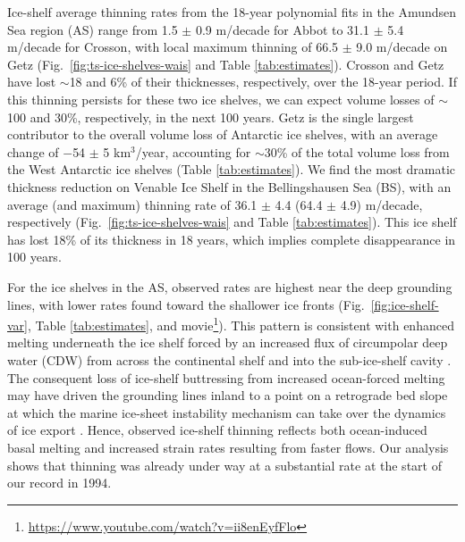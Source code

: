 Ice-shelf average thinning rates from the 18-year polynomial fits in the
Amundsen Sea region (AS) range from 1.5 $\pm$ 0.9 m/decade for Abbot to 
31.1 $\pm$ 5.4 m/decade for Crosson, with local maximum thinning of 
66.5 $\pm$ 9.0 m/decade on Getz (Fig.~\ref{fig:ts-ice-shelves-wais} and Table
\ref{tab:estimates}). Crosson and Getz have lost $\sim$18 and 6\% of their
thicknesses, respectively, over the 18-year period. If this thinning persists
for these two ice shelves, we can expect volume losses of $\sim$100 and 30\%,
respectively, in the next 100 years. Getz is the single largest contributor to
the overall volume loss of Antarctic ice shelves, with an average change of 
$-$54 $\pm$ 5 km$^3$/year, accounting for $\sim$30\% of the total volume loss
from the West Antarctic ice shelves (Table \ref{tab:estimates}). We find the most
dramatic thickness reduction on Venable Ice Shelf in the Bellingshausen Sea
(BS), with an average (and maximum) thinning rate of 36.1 $\pm$ 4.4
(64.4 $\pm$ 4.9) m/decade, respectively (Fig.~\ref{fig:ts-ice-shelves-wais} and Table
\ref{tab:estimates}). This ice shelf has lost 18\% of its thickness in 18 years,
which implies complete disappearance in 100 years.

For the ice shelves in the AS, observed rates
are highest near the deep grounding lines, with
lower rates found toward the shallower ice fronts
(Fig.~\ref{fig:ice-shelf-var}, Table \ref{tab:estimates}, and movie\footnote{\url{https://www.youtube.com/watch?v=ii8enEyfFlo}}). This pattern is
consistent with enhanced melting underneath
the ice shelf forced by an increased flux of circumpolar
deep water (CDW) from across the continental
shelf and into the sub-ice-shelf cavity
\parencite{Dutrieux2014, Jacobs2011, Thoma2008}. The consequent loss of ice-shelf buttressing
from increased ocean-forced melting may
have driven the grounding lines inland \parencite{Rignot2014} to
a point on a retrograde bed slope at which the
marine ice-sheet instability mechanism can take
over the dynamics of ice export \parencite{Schoof2007, Weertman1974}. Hence,
observed ice-shelf thinning reflects both ocean-induced
basal melting and increased strain rates
resulting from faster flows. Our analysis shows
that thinning was already under way at a substantial
rate at the start of our record in 1994.

